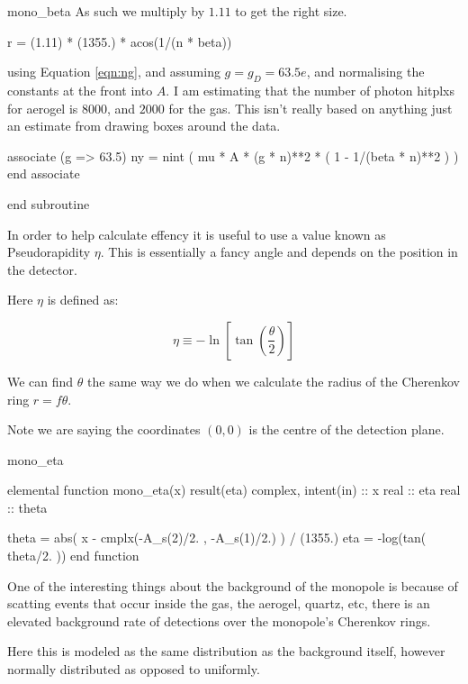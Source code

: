 \documentclass[10pt, a4paper]{article}
\begin{document}
\begin{codeblock}{mono_beta}
As such we multiply by $1.11$ to get the right size.

\begin{code}
	r = (1.11) * (1355.) *  acos(1/(n * beta))
\end{code}

using Equation \eqref{eqn:ng}, and assuming $g = g_D = 63.5e$, and normalising the constants at the front into $A$.
I am estimating that the number of photon hitplxs for aerogel is $8000$, and $2000$ for the gas. This isn't really based on anything just an estimate from drawing boxes around the data.  

\begin{code}
	associate (g => 63.5)
		ny = nint ( mu * A * (g * n)**2 * ( 1 - 1/(beta * n)**2 ) )
	end associate
	
end subroutine
\end{code}
\end{codeblock}


In order to help calculate effency it is useful to use a value known as Pseudorapidity $\eta$. This is essentially a fancy angle and depends on the position in the detector. 

Here $\eta$ is defined as:

\begin{equation}
\eta \equiv -\ln \left[  \tan \left( \frac{\theta}{2} \right)\right]
\end{equation}

We can find $\theta$ the same way we do when we calculate the radius of the Cherenkov ring $r = f\theta$. 

Note we are saying the coordinates $(0,0)$ is the centre of the detection plane.

\begin{codeblock}{mono_eta}
\begin{code}
elemental function mono_eta(x) result(eta)
	complex, intent(in) :: x
	real :: eta
	real :: theta
	
	theta = abs( x - cmplx(-A_s(2)/2. , -A_s(1)/2.) ) / (1355.)
	eta = -log(tan( theta/2. ))
end function
\end{code}
\end{codeblock}

One of the interesting things about the background of the monopole is because of scatting events that occur inside the gas, the aerogel, quartz, etc, there is an elevated background rate of detections over the monopole's Cherenkov rings. 

Here this is modeled as the same distribution as the background itself, however normally distributed as opposed to uniformly.
\end{document}
